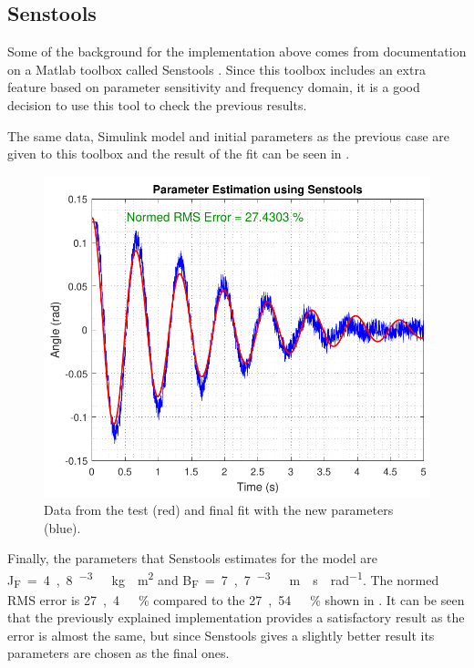 \subsection{Senstools}
Some of the background for the implementation above comes from documentation on a Matlab toolbox called Senstools \cite{Senstools}. Since this toolbox includes an extra feature based on parameter sensitivity and frequency domain, it is a good decision to use this tool to check the previous results.

The same data, Simulink model and initial parameters as the previous case are given to this toolbox and the result of the fit can be seen in . 
%
\begin{figure}[H]
	\centering
	\includegraphics[scale=0.6]{figures/SenseToolParameterEstimation}
	\caption{Data from the test (red) and final fit with the new parameters (blue).}
	\label{SenseToolParameterEstimation}
\end{figure}

Finally, the parameters that Senstools estimates for the model are \si{J_F=4,8 ^{-3}\ kg \cdot m^2} and \si{B_F=7,7 ^{-3}\ m \cdot s \cdot rad^{-1}}. The normed RMS error is \si{27,4\ \%} compared to the \si{27,54\ \%} shown in . It can be seen that the previously explained implementation provides a satisfactory result as the error is almost the same, but since Senstools gives a slightly better result its parameters are chosen as the final ones.

